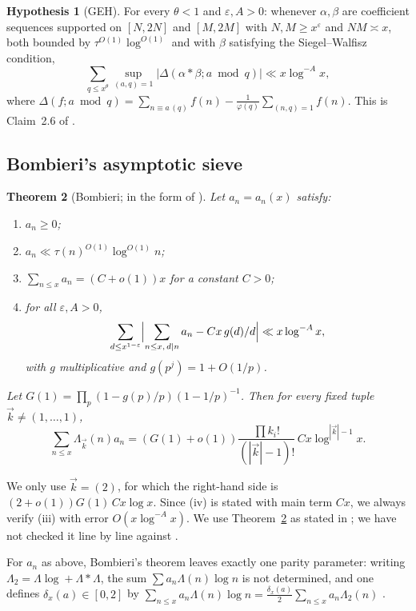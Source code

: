 \documentclass[11pt]{amsart}
\newtheorem{theorem}{Theorem}[section]
\theoremstyle{definition}
\newtheorem{hypothesis}[theorem]{Hypothesis}
\theoremstyle{remark}
\begin{document}
\begin{hypothesis}[GEH]
For every $\theta<1$ and $\varepsilon,A>0$: whenever $\alpha,\beta$ are coefficient sequences supported on $[N,2N]$ and $[M,2M]$ with $N,M\ge x^\varepsilon$ and $NM\asymp x$, both bounded by $\tau^{O(1)}\log^{O(1)}$ and with $\beta$ satisfying the Siegel--Walfisz condition,
\[
\sum_{q\le x^\theta}\sup_{(a,q)=1}|\Delta(\alpha*\beta;a\bmod q)|\ll x\log^{-A}x ,
\]
where $\Delta(f;a\bmod q)=\sum_{n\equiv a\,(q)}f(n)-\frac1{\varphi(q)}\sum_{(n,q)=1}f(n)$. This is Claim~2.6 of \cite{Polymath8b}.
\end{hypothesis}

\subsection{Bombieri's asymptotic sieve}
\begin{theorem}[Bombieri; in the form of {\cite[Thm.~1]{Tao16notes}}]\label{thm:bombieri}
Let $a_n=a_n(x)$ satisfy:
\begin{enumerate}
\item[(i)] $a_n\ge0$;
\item[(ii)] $a_n\ll\tau(n)^{O(1)}\log^{O(1)}n$;
\item[(iii)] $\sum_{n\le x}a_n=(C+o(1))x$ for a constant $C>0$;
\item[(iv)] for all $\varepsilon,A>0$,
\[
\sum_{d\le x^{1-\varepsilon}}\Bigl|\sum_{n\le x,\,d\mid n}a_n-Cx\,g(d)/d\Bigr|\ll x\log^{-A}x,
\]
with $g$ multiplicative and $g(p^j)=1+O(1/p)$.
\end{enumerate}
Let $G(1)=\prod_p(1-g(p)/p)(1-1/p)^{-1}$. Then for every fixed tuple $\vec k\ne(1,\dots,1)$,
\[
\sum_{n\le x}\Lambda_{\vec k}(n)a_n=(G(1)+o(1))\frac{\prod k_i!}{(|\vec k|-1)!}\,Cx\log^{|\vec k|-1}x .
\]
\end{theorem}
We only use $\vec k=(2)$, for which the right-hand side is $(2+o(1))G(1)\,Cx\log x$. Since (iv) is stated with main term $Cx$, we always verify (iii) with error $O(x\log^{-A}x)$. We use Theorem~\ref{thm:bombieri} as stated in \cite{Tao16notes}; we have not checked it line by line against \cite{Bom76}.

For $a_n$ as above, Bombieri's theorem leaves exactly one parity parameter: writing $\Lambda_2=\Lambda\log+\Lambda*\Lambda$, the sum $\sum a_n\Lambda(n)\log n$ is not determined, and one defines $\delta_x(a)\in[0,2]$ by $\sum_{n\le x}a_n\Lambda(n)\log n=\frac{\delta_x(a)}2\sum_{n\le x}a_n\Lambda_2(n)$ \cite{Tao16notes}.

\end{document}
